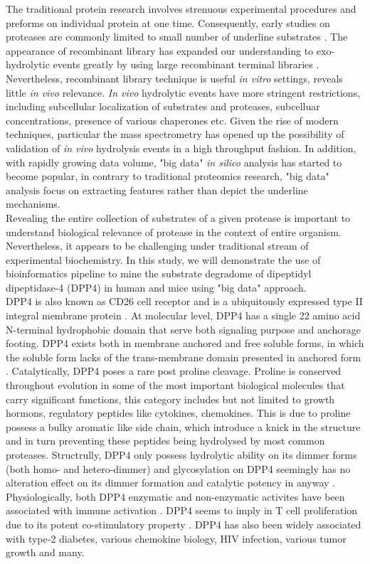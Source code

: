 The traditional protein research involves strenuous experimental procedures and preforms on individual protein at one time. Consequently, early studies on proteases are commonly limited to small number of underline substrates \cite{:1992aa}. The appearance of recombinant library has expanded our understanding to exo-hydrolytic events greatly by using large recombinant terminal libraries \cite{Gupta:2010aa}. Nevertheless, recombinant library technique is useful \textit{in vitro} settings, reveals little \textit{in vivo} relevance. \textit{In vivo} hydrolytic events have more stringent restrictions, including subcellular localization of substrates and proteases, subcelluar concentrations, presence of various chaperones etc. Given the rise of modern techniques, particular the mass spectrometry has opened up the possibility of validation of \textit{in vivo} hydrolysis events in a high throughput fashion. In addition, with rapidly growing data volume, "big data" \textit{in silico} analysis has started to become popular, in contrary to traditional proteomics research, "big data" analysis focus on extracting features rather than depict the underline mechanisms. 
\\
Revealing the entire collection of substrates of a given protease is important to understand biological relevance of protease in the context of entire organism. Nevertheless, it appears to be challenging under traditional stream of experimental biochemistry. In this study, we will demonstrate the use of bioinformatics pipeline to mine the substrate degradome of dipeptidyl dipeptidase-4 (DPP4) in human and mice using "big data" approach. 
\\
DPP4 is also known as CD26 cell receptor \cite{Abbott:2000qr} and is a ubiquitously expressed type II integral membrane protein \cite{Mentlein_1999}. At molecular level, DPP4 has a single 22 amino acid N-terminal hydrophobic domain that serve both signaling purpose and anchorage footing. \cite{Mentlein_1999, Abbott_2002} DPP4 exists both in membrane anchored and free soluble forms, in which the soluble form lacks of the trans-membrane domain presented in anchored form \cite{Lambeir:2001ab,Abbott:2000qr}. Catalytically, DPP4 poses a rare post proline cleavage. Proline is conserved throughout evolution in some of the most important biological molecules that carry significant functions, this category includes but not limited to growth hormons, regulatory peptides like cytokines, chemokines. This is due to proline possess a bulky aromatic like side chain, which introduce a knick in the structure and in turn preventing these peptides being hydrolysed by most common proteases. Structrully, DPP4 only possess hydrolytic ability on its dimmer forms (both homo- and hetero-dimmer) and glycosylation on DPP4 seemingly has no alteration effect on its dimmer formation and catalytic potency in anyway \cite{Aertgeerts:2004aa}. 
\\
Physiologically, both DPP4 enzymatic and non-enzymatic activites have been associated with immune activation \cite{Abbott:2000qr}. DPP4 seems to imply in T cell proliferation due to its potent co-stimulatory property \cite{Mentlein_1999}. DPP4 has also been widely associated with type-2 diabetes, various chemokine biology, HIV infection, various tumor growth and many. 
\\
